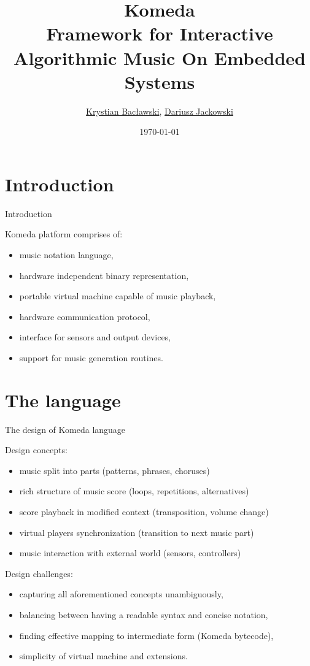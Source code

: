 \documentclass[10pt]{beamer}
\title[Komeda]{
  \Huge{Komeda}\\
  \vspace{0.25em}
  \small{Framework for Interactive Algorithmic Music On Embedded Systems}}
\author[Krystian Bacławski]{
  \href{mailto:cahirwpz@cs.uni.wroc.pl}{Krystian Bacławski}, 
  \href{mailto:yagyu@cs.uni.wroc.pl}{Dariusz Jackowski}}
\institute[University of Wrocław]{
  Computer Science Department\\University of Wrocław}
\date{\today}
\begin{document}
\begin{frame}
\titlepage
\end{frame}

\section{Introduction}

\begin{frame}{Introduction}
  \begin{block}{Komeda platform comprises of:}
    \begin{itemize}
      \item music notation language,
      \item hardware independent binary representation,
      \item portable virtual machine capable of music playback,
      \item hardware communication protocol,
      \item interface for sensors and output devices,
      \item support for music generation routines.
    \end{itemize}
  \end{block}
\end{frame}

\section{The language}

\begin{frame}{The design of Komeda language}
  \begin{block}{Design concepts:}
    \begin{itemize}
      \item music split into parts (patterns, phrases, choruses)
      \item rich structure of music score (loops, repetitions, alternatives)
      \item score playback in modified context (transposition, volume change)
      \item virtual players synchronization (transition to next music part)
      \item music interaction with external world (sensors, controllers)
    \end{itemize}
  \end{block}

  \begin{block}{Design challenges:}
    \begin{itemize}
      \item capturing all aforementioned concepts unambiguously,
      \item balancing between having a readable syntax and concise notation,
      \item finding effective mapping to intermediate form (Komeda bytecode),
      \item simplicity of virtual machine and extensions.
    \end{itemize}
  \end{block}
\end{frame}
\end{document}
